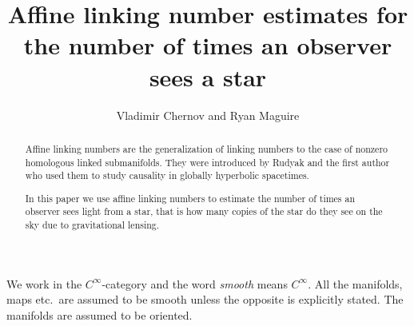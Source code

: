 \documentclass[12pt,reqno,a4paper]{amsart}
\begin{document}
    \def\ss{{X}}
    \renewcommand{\Im}{\mathop{\mathrm{Im}}\nolimits}
    \renewcommand{\Re}{\mathop{\mathrm{Re}}\nolimits}
    \newcommand{\alk}{\mathop{\mathrm{alk}}\nolimits}
    \newcommand{\lk}{\mathop{\mathrm{lk}}\nolimits}

    \newtheorem{mainthm}{Theorem}
    \renewcommand{\themainthm}{{\Alph{mainthm}}}
    \newtheorem{thm}{Theorem}[subsection]


    \theoremstyle{definition}
    \newtheorem{exm}[thm]{Example}
    \newtheorem{rem}[thm]{Remark}
    \newtheorem{df}[thm]{Definition}
    \renewcommand{\thesubsection}{\arabic{subsection}}


    \title[Affine linking number estimates]{%
        Affine linking number estimates for the
        number of times an observer sees a star%
    }
    \author{Vladimir Chernov and Ryan Maguire}
    \address{%
        6188 Kemeny Hall, Department of Mathematics,
        Dartmouth College, Hanover, NH 03755, USA%
    }
    \address{%
        6188 Kemeny Hall, Department of Mathematics,
        Dartmouth College, Hanover, NH 03755, USA%
    }
    \begin{abstract}
        Affine linking numbers are the generalization of linking numbers to
        the case of nonzero homologous linked submanifolds. They were
        introduced by Rudyak and the first author who used them to study
        causality in globally hyperbolic spacetimes.

        In this paper we use affine linking numbers to estimate the number
        of times an observer sees light from a star, that is how many copies
        of the star do they see on the sky due to gravitational lensing.
    \end{abstract}
    \maketitle
    We work in the $C^{\infty}$-category and the word {\it smooth\/}
    means $C^{\infty}.$ All the manifolds, maps etc.~are
    assumed to be smooth unless the opposite is explicitly stated. The
    manifolds are assumed to be oriented.
\end{document}
